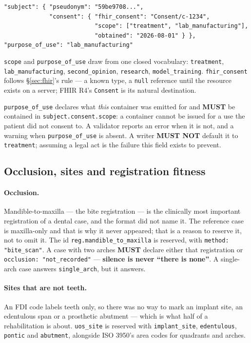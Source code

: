 \documentclass[11pt,a4paper]{article}
\newcommand{\MUST}{\textcolor{uosred}{\textbf{MUST}}}
\newcommand{\MUSTNOT}{\textcolor{uosred}{\textbf{MUST NOT}}}
\newcommand{\code}[1]{\texttt{\small #1}}
\begin{document}
\begin{lstlisting}[style=js]
"subject": { "pseudonym": "59be9708...",
             "consent": { "fhir_consent": "Consent/c-1234",
                          "scope": ["treatment", "lab_manufacturing"],
                          "obtained": "2026-08-01" } },
"purpose_of_use": "lab_manufacturing"
\end{lstlisting}

\code{scope} and \code{purpose\_of\_use} draw from one closed vocabulary:
\code{treatment}, \code{lab\_manufacturing}, \code{second\_opinion}, \code{research},
\code{model\_training}. \code{fhir\_consent} follows \S\ref{sec:fhir}'s rule --- a known
type, a \code{null} reference until the resource exists on a server; FHIR R4's
\code{Consent} is its natural destination.

\code{purpose\_of\_use} declares what \emph{this} container was emitted for and \MUST{} be
contained in \code{subject.consent.scope}: a container cannot be issued for a use the
patient did not consent to. A validator reports an error when it is not, and a warning when
\code{purpose\_of\_use} is absent. A writer \MUSTNOT{} default it to \code{treatment};
assuming a legal act is the failure this field exists to prevent.

\subsection{Occlusion, sites and registration fitness}\label{sec:dentistry}

\paragraph{Occlusion.} Mandible-to-maxilla --- the bite registration --- is the
clinically most important registration of a dental case, and the format did not name it.
The reference case is maxilla-only and that is why it never appeared; that is a reason to
reserve it, not to omit it. The id \code{reg.mandible\_to\_maxilla} is reserved, with
\code{method: "bite\_scan"}. A case with two arches \MUST{} declare either that
registration or \code{occlusion: "not\_recorded"} --- \textbf{silence is never ``there
is none''}. A single-arch case answers \code{single\_arch}, but it answers.

\paragraph{Sites that are not teeth.} An FDI code labels teeth only, so there was no
way to mark an implant site, an edentulous span or a prosthetic abutment --- which is what
half of a rehabilitation is about. \code{uos\_site} is reserved with
\code{implant\_site}, \code{edentulous}, \code{pontic} and \code{abutment}, alongside ISO
3950's area codes for quadrants and arches.
\end{document}
